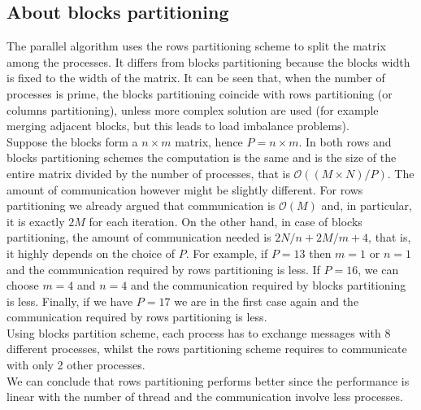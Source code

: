 \documentclass{article}
\begin{document}
\subsection{About blocks partitioning} \label{sec:blockpartitioning}
The parallel algorithm uses the rows partitioning scheme to split the matrix among the processes. It differs from blocks partitioning because the blocks width is fixed to the width of the matrix. It can be seen that, when the number of processes is prime, the blocks partitioning coincide with rows partitioning (or columns partitioning), unless more complex solution are used (for example merging adjacent blocks, but this leads to load imbalance problems). \\
Suppose the blocks form a $n \times m$ matrix, hence $P = n \times m$. In both rows and blocks partitioning schemes the computation is the same and is the size of the entire matrix divided by the number of processes, that is $\mathcal{O}((M \times N) / P)$. The amount of communication however might be slightly different. For rows partitioning we already argued that communication is $\mathcal{O}(M)$ and, in particular, it is exactly $2M$ for each iteration. On the other hand, in case of blocks partitioning, the amount of communication needed is $2N/n + 2M/m + 4$, that is, it highly depends on the choice of $P$. For example, if $P = 13$ then $m = 1$ or $n = 1$ and the communication required by rows partitioning is less. If $P = 16$, we can choose $m = 4$ and $n = 4$ and the communication required by blocks partitioning is less. Finally, if we have $P = 17$ we are in the first case again and the communication required by rows partitioning is less. \\
Using blocks partition scheme, each process has to exchange messages with 8 different processes, whilst the rows partitioning scheme requires to communicate with only 2 other processes. \\
We can conclude that rows partitioning performs better since the performance is linear with the number of thread and the communication involve less processes.
\end{document}
